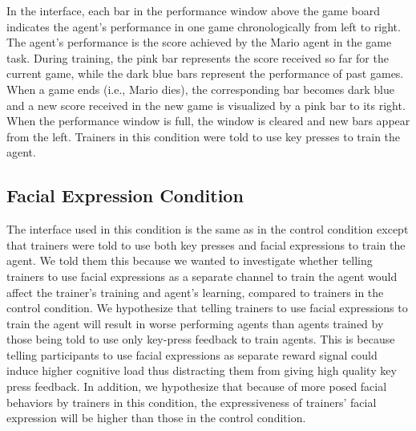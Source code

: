 \documentclass[10pt,journal,compsoc]{IEEEtran}
\begin{document}
In the interface, each bar in the performance window above the game board indicates the agent's performance in one game chronologically from left to right. The agent's performance is the score achieved by the Mario agent in the game task. During training, the pink bar represents the score received so far for the current game, while the dark blue bars represent the performance of past games. When a game ends (i.e., Mario dies), the corresponding bar becomes dark blue and a new score received in the new game is visualized by a pink bar to its right. When the performance window is full, the window is cleared and new bars appear from the left. Trainers in this condition were told to use key presses to train the agent.



\subsection{Facial Expression Condition}
The interface used in this condition is the same as in the control condition except that trainers were told to use both key presses and facial expressions to train the agent. We told them this because we wanted to investigate whether telling trainers to use facial expressions as a separate channel to train the agent would affect the trainer's training and agent's learning, compared to trainers in the control condition. We hypothesize that telling trainers to use facial expressions to train the agent will result in worse performing agents than agents trained by those being told to use only key-press feedback to train agents. This is because telling participants to use facial expressions as separate reward signal could induce higher cognitive load thus distracting them from giving high quality key press feedback. In addition, we hypothesize that because of more posed facial behaviors by trainers in this condition, the expressiveness of trainers' facial expression will be higher than those in the control condition. %
\end{document}

